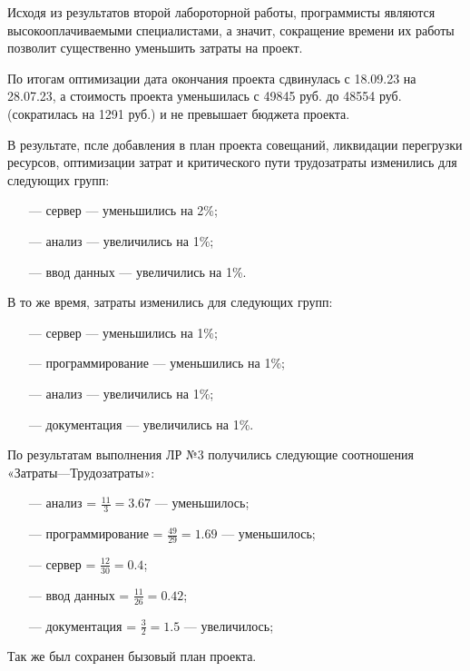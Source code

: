 Исходя из результатов второй лабороторной работы, программисты являются высокооплачиваемыми специалистами, а значит, сокращение времени их работы позволит существенно уменьшить затраты на проект.

По итогам оптимизации дата окончания проекта сдвинулась с 18.09.23 на 28.07.23, а стоимость проекта уменьшилась с 49845 руб. до 48554 руб. (сократилась на 1291 руб.) и не превышает бюджета проекта.

В результате, псле добавления в план проекта совещаний, ликвидации перегрузки ресурсов, оптимизации затрат и критического пути трудозатраты изменились для следующих групп:

\begin{itemize}
    \item[---] сервер --- уменьшились на 2\%;
    \item[---] анализ --- увеличились на 1\%;
    \item[---] ввод данных --- увеличились на 1\%.
\end{itemize}


В то же время, затраты изменились для следующих групп:

\begin{itemize}
     \item[---] сервер --- уменьшились на 1\%;
     \item[---] программирование --- уменьшились на 1\%;
     \item[---] анализ — увеличились на 1\%;
     \item[---] документация — увеличились на 1\%.
\end{itemize}


По результатам выполнения ЛР №3 получились следующие соотношения «Затраты---Трудозатраты»:

\begin{itemize}
    \item[---] анализ = $\frac{11}{3} = 3.67$ --- уменьшилось;
    \item[---] программирование = $\frac{49}{29} = 1.69$ --- уменьшилось;
    \item[---] сервер = $\frac{12}{30} = 0.4$;
    \item[---] ввод данных = $\frac{11}{26} = 0.42$;
    \item[---] документация = $\frac{3}{2} = 1.5$ --- увеличилось;
\end{itemize}

Так же был сохранен бызовый план проекта.

